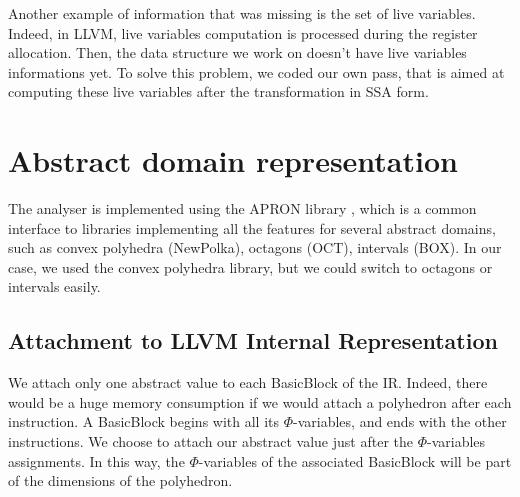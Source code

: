 \documentclass[a4paper,english,titlepage,11pt]{report}
\begin{document}
Another example of information that was missing is the set of live variables.
Indeed, in LLVM, live variables computation is processed during the register
allocation. Then, the data structure we work on doesn't have live variables
informations yet. To solve this problem, we coded our own pass, that is aimed at
computing these live variables after the transformation in SSA form.

 \section{Abstract domain representation}

	The analyser is implemented using the APRON library \cite{JM09}, which
	is a common interface to libraries implementing all the features
	for several abstract domains, such as convex polyhedra (NewPolka), 
	octagons (OCT), intervals (BOX).
	In our case, we used the convex polyhedra library, but we could switch
	to octagons or intervals easily.

	\subsection{Attachment to LLVM Internal Representation}

	We attach only one abstract value to each BasicBlock of the IR. Indeed,
	there would be a huge memory consumption if we would attach a polyhedron
	after each instruction. A BasicBlock begins with all its $\Phi$-variables,
	and ends with the other instructions. We choose to attach our abstract value
	just after the $\Phi$-variables assignments. In this way, the
	$\Phi$-variables of the associated BasicBlock will be part of the dimensions
	of the polyhedron.
\end{document}
